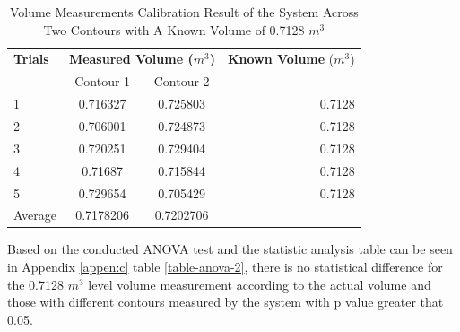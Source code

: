 \begin{enumerate}
	      \begin{table}[H]
		      \centering
		      \begin{threeparttable}
			      \caption{Volume Measurements Calibration Result of the System Across Two Contours with A Known Volume of 0.7128 $m^3$}
			      \label{table:test_case_2-3_results}
			      \begin{tabular}{l c c r}
				      \toprule
				      \textbf{Trials} & \multicolumn{2}{c}{\textbf{Measured Volume ($m^{3}$)}} & \textbf{Known Volume} ($m^{3}$)          \\
				      {}              & Contour 1                                              & Contour 2                       & {}     \\ \midrule
				      1               & 0.716327                                               & 0.725803                        & 0.7128 \\
				      2               & 0.706001                                               & 0.724873                        & 0.7128 \\
				      3               & 0.720251                                               & 0.729404                        & 0.7128 \\
				      4               & 0.71687                                                & 0.715844                        & 0.7128 \\
				      5               & 0.729654                                               & 0.705429                        & 0.7128 \\ \midrule
				      Average         & 0.7178206                                              & 0.7202706                       & {}     \\ \bottomrule
			      \end{tabular}
		      \end{threeparttable}
	      \end{table}




	      Based on the conducted ANOVA test and the statistic analysis table can be seen in Appendix \ref{appen:c} table \ref{table-anova-2}, there is no statistical difference for the 0.7128 $m^3$ level volume measurement according to the actual volume and those with different contours measured by the system with p value greater that 0.05.
\end{enumerate}

